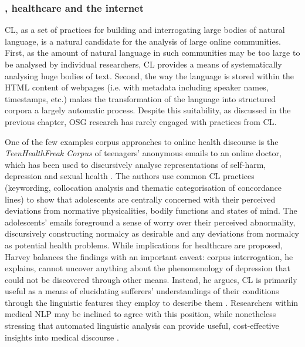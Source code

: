 
\subsubsection{, healthcare and the internet}

\gls{CL}, as a set of practices for building and interrogating large bodies of natural language, is a natural candidate for the analysis of large online communities. First, as the amount of natural language in such communities may be too large to be analysed by individual researchers, \gls{CL} provides a means of systematically analysing huge bodies of text. Second, the way the language is stored within the \gls{HTML} content of webpages (i.e. with metadata including speaker names, timestamps, etc.) makes the transformation of the language into structured corpora a largely automatic process. Despite this suitability, as discussed in the previous chapter, \gls{OSG} research has rarely engaged with practices from \gls{CL}. 

One of the few examples corpus approaches to online health discourse is the \emph{TeenHealthFreak Corpus} of teenagers' anonymous emails to an online doctor, which has been used to discursively analyse representations of self\hyp{}harm, depression and sexual health \cite[in][respectively]{harvey_disclosures_2012,harvey_health_2012,harvey_am_2007}. The authors use common \gls{CL} practices (keywording, collocation analysis and thematic categorisation of concordance lines) to show that adolescents are centrally concerned with their perceived deviations from normative physicalities, bodily functions and states of mind. The adolescents' emails foreground a sense of worry over their perceived abnormality, discursively constructing normalcy as desirable and any deviations from normalcy as potential health problems. While implications for healthcare are proposed, Harvey balances the findings with an important caveat: \gls{corpus} interrogation, he explains, cannot uncover anything about the phenomenology of depression that could not be discovered through other means. Instead, he argues, \gls{CL} is primarily useful as a means of elucidating sufferers' understandings of their conditions through the linguistic features they employ to describe them \citeyear{harvey_disclosures_2012}. Researchers within medical NLP may be inclined to agree with this position, while nonetheless stressing that automated linguistic analysis can provide useful, cost\hyp{}effective insights into medical discourse \cite{maclean_forum77:_2015}.

